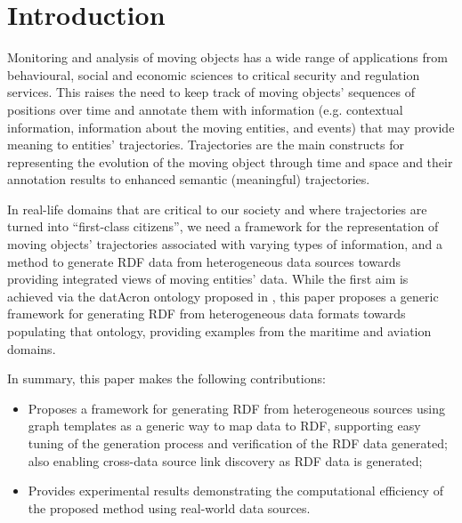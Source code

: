 \documentclass{sig-alternate}
\begin{document}


\section{Introduction }

Monitoring and analysis of moving objects has a wide range of applications from behavioural, social and economic sciences to critical security and regulation services. This raises the need to keep track of moving objects' sequences of positions over time and annotate them with information (e.g. contextual information, information about the moving entities, and events) that may provide meaning to entities' trajectories. Trajectories are the main constructs for representing the evolution of the moving object through time and space and their annotation results to enhanced semantic (meaningful) trajectories. 

In real-life domains that are critical to our society and where trajectories are turned into ``first-class citizens'', we need a framework for the representation of moving objects' trajectories associated with varying types of information, and a method to generate RDF data from heterogeneous data sources towards providing integrated views of moving entities' data. While the first aim is achieved via the datAcron ontology proposed in  \cite{_Ref490495645}, this paper proposes a generic framework for generating RDF from heterogeneous data formats towards populating that ontology, providing examples from the maritime and aviation domains. 

In summary, this paper makes the following contributions: 
\begin{itemize}
\item Proposes a framework for generating RDF from heterogeneous sources using graph templates as a generic way to map data to RDF, supporting easy tuning of the generation process and verification of the RDF data generated; also enabling cross-data source link discovery as RDF data is generated;
\item Provides experimental results demonstrating the computational efficiency of the proposed method using real-world data sources.
\end{itemize}
\end{document}
